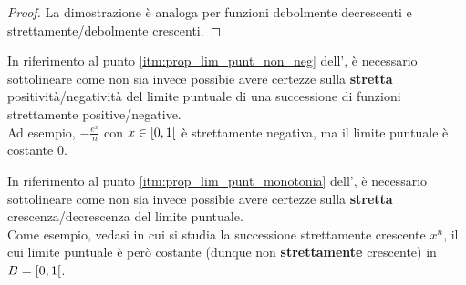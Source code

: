 \begin{exercise}
\begin{solution}
\begin{enumerate}
\begin{proof}
					La dimostrazione è analoga per funzioni debolmente decrescenti e strettamente/debolmente crescenti.
					\let\qed\relax %
				\end{proof}
			\vspace*{-2\baselineskip} %
		\end{enumerate}
	\end{solution}
\end{exercise}
\begin{observation}
	In riferimento al punto \ref{itm:prop_lim_punt_non_neg} dell', è necessario sottolineare come non sia invece possibie avere certezze sulla \textbf{stretta} positività/negatività del limite puntuale di una successione di funzioni strettamente positive/negative.\\
	Ad esempio, $-\frac{e^x}{n}$ con $x \in \left[0,1\right[$ è strettamente negativa, ma il limite puntuale è costante $0$.
\end{observation}
\begin{observation}
	In riferimento al punto \ref{itm:prop_lim_punt_monotonia} dell', è necessario sottolineare come non sia invece possibie avere certezze sulla \textbf{stretta} crescenza/decrescenza del limite puntuale.\\
	Come esempio, vedasi  in cui si studia la successione strettamente crescente $x^n$, il cui limite puntuale è però costante (dunque non \textbf{strettamente} crescente) in $B = \left[0,1\right[$.
\end{observation}

\cbstart

